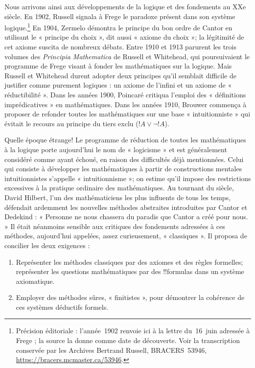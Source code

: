 \documentclass[../../../include/open-logic-section]{subfiles}
\begin{document}
Nous arrivons ainsi aux développements de la logique et des
fondements au XXe siècle. En 1902, Russell signala à Frege le paradoxe
présent dans son système logique.\footnote{Précision éditoriale : l'année~1902 renvoie ici à la lettre du~16~juin adressée à Frege ; la source la donne comme date de découverte. Voir la transcription conservée par les Archives Bertrand Russell, BRACERS~53946, \url{https://bracers.mcmaster.ca/53946}.} En 1904, Zermelo démontra
le principe du bon ordre de Cantor en utilisant le « principe du
choix », dit aussi « axiome du choix »; la légitimité de cet axiome
suscita de nombreux débats. Entre 1910 et 1913 parurent les trois
volumes des \emph{Principia Mathematica} de Russell et Whitehead,
qui poursuivaient le programme de Frege visant à fonder les
mathématiques sur la logique. Mais Russell et Whitehead durent
adopter deux principes qu'il semblait difficile de justifier comme
purement logiques : un axiome de l'infini et un axiome de
« réductibilité ». Dans les années 1900, Poincar\'e critiqua
l'emploi des « définitions imprédicatives » en mathématiques. Dans
les années 1910, Brouwer commença à proposer de refonder toutes
les mathématiques sur une base « intuitionniste » qui évitait le
recours au principe du tiers exclu ($!A \lor \lnot !A$).

Quelle époque étrange!{} Le programme de réduction de toutes les
mathématiques à la logique porte aujourd'hui le nom de
« logicisme » et est généralement considéré comme ayant échoué,
en raison des difficultés déjà mentionnées. Celui qui consiste à
développer les mathématiques à partir de constructions mentales
intuitionnistes s'appelle « intuitionnisme »; on estime qu'il
impose des restrictions excessives à la pratique ordinaire des
mathématiques. Au tournant du siècle, David Hilbert, l'un des
mathématiciens les plus influents de tous les temps, défendait
ardemment les nouvelles méthodes abstraites introduites par Cantor
et Dedekind : « Personne ne nous chassera du paradis que Cantor a
créé pour nous. » Il était néanmoins sensible aux critiques des
fondements adressées à ces méthodes, aujourd'hui appelées, assez
curieusement, « classiques ». Il proposa de concilier les deux
exigences :
\begin{enumerate}
\item Représenter les méthodes classiques par des axiomes et des
  règles formelles; représenter les questions mathématiques par des
  !!{formula}s dans un système axiomatique.
\item Employer des méthodes sûres, « finitistes », pour démontrer
  la cohérence de ces systèmes déductifs formels.
\end{enumerate}
\end{document}
